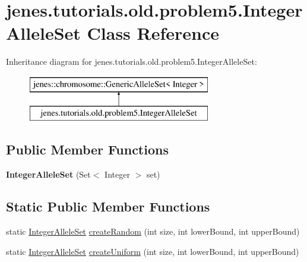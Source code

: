 \hypertarget{classjenes_1_1tutorials_1_1old_1_1problem5_1_1_integer_allele_set}{\section{jenes.\-tutorials.\-old.\-problem5.\-Integer\-Allele\-Set Class Reference}
\label{classjenes_1_1tutorials_1_1old_1_1problem5_1_1_integer_allele_set}
}
Inheritance diagram for jenes.\-tutorials.\-old.\-problem5.\-Integer\-Allele\-Set\-:\begin{figure}[H]
\begin{center}
\leavevmode
\includegraphics[height=2.000000cm]{classjenes_1_1tutorials_1_1old_1_1problem5_1_1_integer_allele_set}
\end{center}
\end{figure}
\subsection*{Public Member Functions}
\begin{DoxyCompactItemize}
\item 
\hypertarget{classjenes_1_1tutorials_1_1old_1_1problem5_1_1_integer_allele_set_a4bf775d640641b83dd1c53564b00f263}{{\bfseries Integer\-Allele\-Set} (Set$<$ Integer $>$ set)}\label{classjenes_1_1tutorials_1_1old_1_1problem5_1_1_integer_allele_set_a4bf775d640641b83dd1c53564b00f263}

\end{DoxyCompactItemize}
\subsection*{Static Public Member Functions}
\begin{DoxyCompactItemize}
\item 
static \hyperlink{classjenes_1_1tutorials_1_1old_1_1problem5_1_1_integer_allele_set}{Integer\-Allele\-Set} \hyperlink{classjenes_1_1tutorials_1_1old_1_1problem5_1_1_integer_allele_set_aab816bbf2219835d788ceb8b8a92007c}{create\-Random} (int size, int lower\-Bound, int upper\-Bound)
\item 
static \hyperlink{classjenes_1_1tutorials_1_1old_1_1problem5_1_1_integer_allele_set}{Integer\-Allele\-Set} \hyperlink{classjenes_1_1tutorials_1_1old_1_1problem5_1_1_integer_allele_set_af952e89dffc31630da0371be73bae906}{create\-Uniform} (int size, int lower\-Bound, int upper\-Bound)
\end{DoxyCompactItemize}


